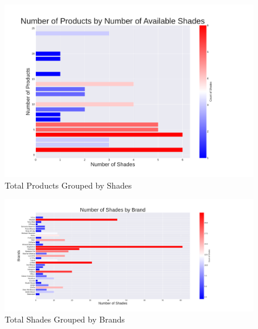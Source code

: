 \documentclass{article}
\begin{document}
\begin{center}
    \begin{figure}[htbp]
        \centering
        \includegraphics[scale=0.4]{../images/Indonesia-graphs/TotalProductsByShades.pdf}
        \caption{Total Products Grouped by Shades}
        \label{Products_by_Shades}
    \end{figure}


    \begin{landscape}
        \begin{figure}[htbp]
            \centering
            \includegraphics[scale=0.55]{../images/Indonesia-graphs/TotalShadesByBrand.pdf}
            \caption{Total Shades Grouped by Brands}
            \label{Shades_by_Brands}
        \end{figure}
    \end{landscape}


\end{center}
\end{document}
